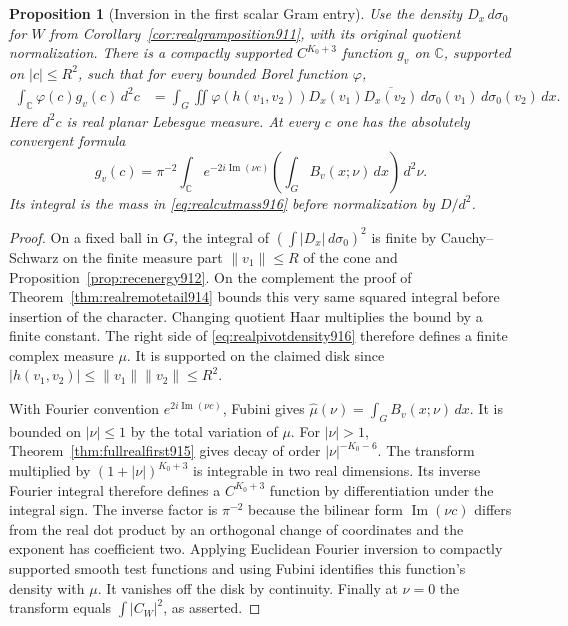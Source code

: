 \documentclass[a4paper,11pt]{article}
\newtheorem{proposition}{Proposition}[section]
\theoremstyle{definition}
\theoremstyle{remark}
\numberwithin{equation}{section}
\begin{document}
\begin{proposition}[Inversion in the first scalar Gram entry]
\leavevmode\label{prop:realpivotdensity916}
Use the density \(D_x\,d\sigma_0\) for \(W\) from
Corollary~\ref{cor:realgramposition911}, with its original
quotient normalization. There is a compactly supported
\(C^{K_0+3}\) function \(g_v\) on \(\mathbb C\), supported on
\(|c|\le R^2\), such that for every bounded Borel function
\(\varphi\),
\begin{align}
 \int_{\mathbb C}\varphi(c)g_v(c)\,d^2c
  &=\int_G\iint
     \varphi(h(v_1,v_2))D_x(v_1)\overline{D_x(v_2)}
                      \,d\sigma_0(v_1)\,d\sigma_0(v_2)\,dx .
 \label{eq:realpivotdensity916}
\end{align}
Here \(d^2c\) is real planar Lebesgue measure. At every \(c\)
one has the absolutely convergent formula
\[
 g_v(c)=\pi^{-2}\int_{\mathbb C}
     e^{-2i\operatorname{Im}(\nu c)}
       \left(\int_G B_v(x;\nu)\,dx\right)\,d^2\nu.
\]
Its integral is the mass in \eqref{eq:realcutmass916} before
normalization by \(D/d^2\).
\end{proposition}
\begin{proof}
On a fixed ball in \(G\), the integral of
\((\int |D_x|\,d\sigma_0)^2\) is finite by Cauchy--Schwarz
on the finite measure part \(\|v_1\|\le R\) of the cone
and Proposition~\ref{prop:recenergy912}. On the complement
the proof of Theorem~\ref{thm:realremotetail914} bounds this
very same squared integral before insertion of the character.
Changing quotient Haar multiplies the bound by a finite
constant. The right side of \eqref{eq:realpivotdensity916}
therefore defines a finite complex measure \(\mu\). It is
supported on the claimed disk since
\(|h(v_1,v_2)|\le\|v_1\|\|v_2\|\le R^2\).

With Fourier convention \(e^{2i\operatorname{Im}(\nu c)}\),
Fubini gives \(\widehat\mu(\nu)=\int_G B_v(x;\nu)\,dx\).
It is bounded on \(|\nu|\le1\) by the total variation of
\(\mu\). For \(|\nu|>1\), Theorem~\ref{thm:fullrealfirst915}
gives decay of order \(|\nu|^{-K_0-6}\). The transform
multiplied by \((1+|\nu|)^{K_0+3}\) is integrable in two
real dimensions. Its inverse Fourier integral therefore
defines a \(C^{K_0+3}\) function by differentiation under the
integral sign. The inverse factor is \(\pi^{-2}\) because the
bilinear form \(\operatorname{Im}(\nu c)\) differs from the
real dot product by an orthogonal change of coordinates and
the exponent has coefficient two. Applying Euclidean Fourier
inversion to compactly supported smooth test functions and
using Fubini identifies this function's density with \(\mu\).
It vanishes off the disk by continuity. Finally at \(\nu=0\)
the transform equals \(\int |C_W|^2\), as asserted.
\end{proof}
\clearpage
\end{document}

